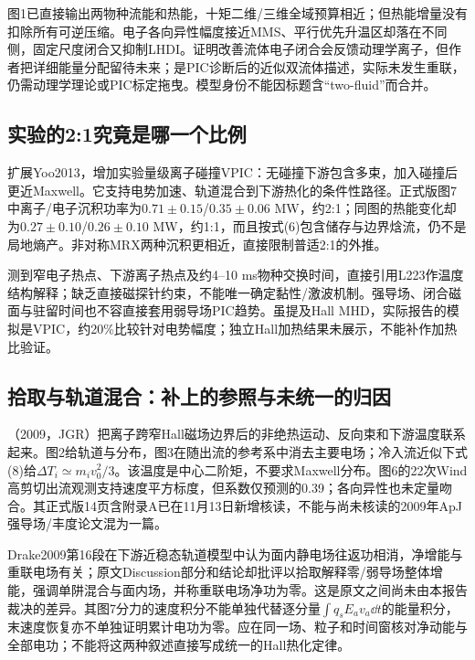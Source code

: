 \citet{TenBarge2019MMS}图1已直接输出两物种流能和热能，十矩二维/三维全域预算相近；但热能增量没有扣除所有可逆压缩。电子各向异性幅度接近MMS、平行优先升温区却落在不同侧，固定尺度闭合又抑制LHDI。\citet{Finelli2021}证明改善流体电子闭合会反馈动理学离子，但作者把详细能量分配留待未来；\citet{Che2014Buneman}是PIC诊断后的近似双流体描述，实际未发生重联，仍需动理学理论或PIC标定拖曳。模型身份不能因标题含“two-fluid”而合并。

\subsection{实验的2:1究竟是哪一个比例}
\citet{F679}扩展Yoo2013，增加实验量级离子碰撞VPIC：无碰撞下游包含多束，加入碰撞后更近Maxwell。它支持电势加速、轨道混合到下游热化的条件性路径。\citet{F674}正式版图7中离子/电子沉积功率为$0.71\pm0.15$/$0.35\pm0.06$ MW，约2:1；同图的热能变化却为$0.27\pm0.10$/$0.26\pm0.10$ MW，约1:1，而且按式(6)包含储存与边界焓流，仍不是局地熵产。\citet{Yoo2017Heating}非对称MRX两种沉积更相近，直接限制普适2:1的外推。

\citet{Tanabe2015MAST}测到窄电子热点、下游离子热点及约4--10 ms物种交换时间，直接引用L223作温度结构解释；缺乏直接磁探针约束，不能唯一确定黏性/激波机制。强导场、闭合磁面与驻留时间也不容直接套用弱导场PIC趋势。\citet{TS6FEC2025}虽提及Hall MHD，实际报告的模拟是VPIC，约20\%比较针对电势幅度；独立Hall加热结果未展示，不能补作加热比验证。

\subsection{拾取与轨道混合：补上的参照与未统一的归因}
\citet{Drake2009Pickup}（2009，JGR）把离子跨窄Hall磁场边界后的非绝热运动、反向束和下游温度联系起来。图2给轨道与分布，图3在随出流的参考系中消去主要电场；冷入流近似下式(8)给$\Delta T_i\simeq m_iv_0^2/3$。该温度是中心二阶矩，不要求Maxwell分布。图6的22次Wind高剪切出流观测支持速度平方标度，但系数仅预测的0.39；各向异性也未定量吻合。其正式版14页含附录A已在11月13日新增核读，不能与尚未核读的2009年ApJ强导场/丰度论文混为一篇。

Drake2009第16段在下游近稳态轨道模型中认为面内静电场往返功相消，净增能与重联电场有关；\citet{Yoon2023PhaseSpace}原文Discussion部分和结论却批评以拾取解释零/弱导场整体增能，强调单阱混合与面内场，并称重联电场净功为零。这是原文之间尚未由本报告裁决的差异。其图7分力的速度积分不能单独代替逐分量$\int q_sE_av_a\dd t$的能量积分，末速度恢复亦不单独证明累计电功为零。应在同一场、粒子和时间窗核对净动能与全部电功；不能将这两种叙述直接写成统一的Hall热化定律。

